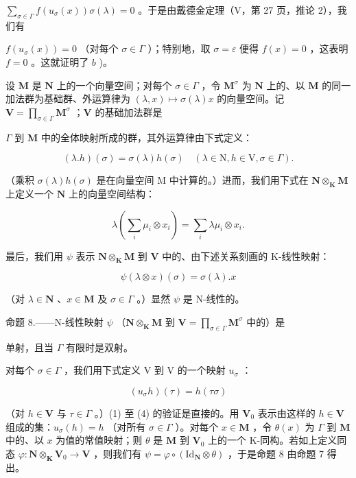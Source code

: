 \(\sum_{\sigma \in \Gamma}f(u_{\sigma}(x))\sigma (\lambda) = 0\) 。于是由戴德金定理（V，第 27 页，推论 2），我们有

\(f(u_{\sigma}(x)) = 0\) （对每个 \(\sigma \in \Gamma\) ）；特别地，取 \(\sigma = \varepsilon\) 便得 \(f(x) = 0\) ，这表明 \(f = 0\) 。这就证明了 \(b\) )。

设 \(\mathbf{M}\) 是 \(\mathbf{N}\) 上的一个向量空间；对每个 \(\sigma \in \Gamma\) ，令 \(\mathbf{M}^{\sigma}\) 为 \(\mathbf{N}\) 上的、以 \(\mathbf{M}\) 的同一加法群为基础群、外运算律为 \((\lambda, x) \mapsto \sigma(\lambda)x\) 的向量空间。记 \(\mathbf{V} = \prod_{\sigma \in \Gamma} \mathbf{M}^{\sigma}\) ；\(\mathbf{V}\) 的基础加法群是

\(\Gamma\) 到 \(\mathbf{M}\) 中的全体映射所成的群，其外运算律由下式定义：

\[
(\lambda . h) (\sigma) = \sigma (\lambda) h (\sigma) \quad (\lambda \in \mathrm{N}, h \in \mathrm{V}, \sigma \in \Gamma).\tag{5}
\]

（乘积 \(\sigma(\lambda) h(\sigma)\) 是在向量空间 M 中计算的。）进而，我们用下式在 \(\mathbf{N} \otimes_{\mathbf{K}} \mathbf{M}\) 上定义一个 \(\mathbf{N}\) 上的向量空间结构：

\[
\lambda \left(\sum_ {i} \mu_ {i} \otimes x _ {i}\right) = \sum_ {i} \lambda \mu_ {i} \otimes x _ {i}.
\]

最后，我们用 \(\psi\) 表示 \(\mathbf{N} \otimes_{\mathbf{K}} \mathbf{M}\) 到 \(\mathbf{V}\) 中的、由下述关系刻画的 K-线性映射：

\[
\psi (\lambda \otimes x) (\sigma) = \sigma (\lambda). x\tag{6}
\]

（对 \(\lambda \in \mathbf{N}\) 、\(x \in \mathbf{M}\) 及 \(\sigma \in \Gamma\) 。）显然 \(\psi\) 是 N-线性的。

命题 8.——N-线性映射 \(\psi\) （\(\mathbf{N} \otimes_{\mathbf{K}} \mathbf{M}\) 到 \(\mathbf{V} = \prod_{\sigma \in \Gamma} \mathbf{M}^{\sigma}\) 中的）是

单射，且当 \(\Gamma\) 有限时是双射。

对每个 \(\sigma\in\Gamma\) ，我们用下式定义 V 到 V 的一个映射 \(u_{\sigma}\) ：

\[
\left(u _ {\sigma} h\right) (\tau) = h (\tau \sigma)\tag{7}
\]

（对 \(h \in \mathbf{V}\) 与 \(\tau \in \Gamma\) 。）(1) 至 (4) 的验证是直接的。用 \(\mathbf{V}_0\) 表示由这样的 \(h \in \mathbf{V}\) 组成的集：\(u_{\sigma}(h) = h\) （对所有 \(\sigma \in \Gamma\) ）。对每个 \(x \in \mathbf{M}\) ，令 \(\theta(x)\) 为 \(\Gamma\) 到 \(\mathbf{M}\) 中的、以 \(x\) 为值的常值映射；则 \(\theta\) 是 \(\mathbf{M}\) 到 \(\mathbf{V}_0\) 上的一个 K-同构。若如上定义同态 \(\varphi: \mathbf{N} \otimes_{\mathbf{K}} \mathbf{V}_0 \to \mathbf{V}\) ，则我们有 \(\psi = \varphi \circ (\mathrm{Id}_{\mathbf{N}} \otimes \theta)\) ，于是命题 8 由命题 7 得出。

